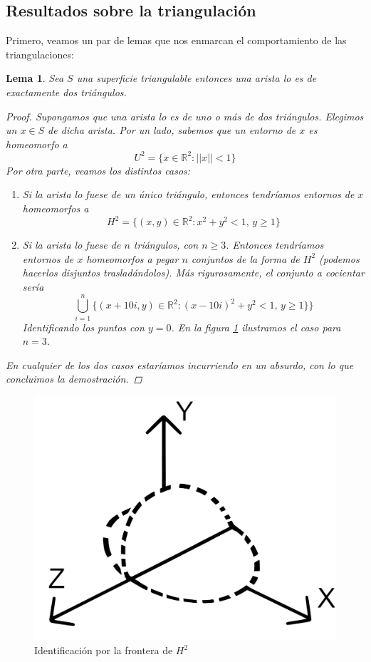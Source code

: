 \documentclass[a4paper,11pt,spanish, twoside, leqno]{tfg-uam}
\newcommand*{\reales}{\mathbb{R}}
\newtheorem{lema}[teor]{Lema}
\theoremstyle{definition}
\begin{document}
\subsection*{Resultados sobre la triangulación}

Primero, veamos un par de lemas que nos enmarcan el comportamiento de las triangulaciones:

\begin{lema}\label{lema:lema1detriangulacion}
Sea $S$ una superficie triangulable entonces una arista lo es de exactamente dos triángulos.

\begin{proof}
Supongamos que una arista lo es de uno o más de dos triángulos. Elegimos un $x\in S$ de dicha arista. Por un lado, sabemos que un entorno de $x$ es homeomorfo a 
\[U^2 = \{x\in\reales^2: ||x||<1\}\]
Por otra parte, veamos los distintos casos:

\begin{enumerate}
\item[(a)] Si la arista lo fuese de un único triángulo, entonces tendríamos entornos de $x$ homeomorfos a
\[ H^2 = \{(x,y)\in\reales^2: x^2+y^2<1, \, y\geq 1 \} \]

\item[(b)] Si la arista lo fuese de  $n$ triángulos, con $n\geq 3$. Entonces tendríamos entornos de $x$ homeomorfos a pegar $n$ conjuntos de la forma de $H^2$ (podemos hacerlos disjuntos trasladándolos). Más rigurosamente, el conjunto a cocientar sería
\[
   \bigcup^n_{i=1} \{(x+10i,y)\in\reales^2: (x-10i)^2+y^2<1, \, y\geq 1 \} \}	        
\]
Identificando los puntos con $y=0$. En la figura \ref{fig:tripleplano} ilustramos el caso para $n=3$.
\end{enumerate}    

En cualquier de los dos casos estaríamos incurriendo en un absurdo, con lo que concluimos la demostración.
\end{proof}
\end{lema}

\begin{figure}[h!]
	\centering
	\includegraphics[width=0.4\linewidth]{imagenes/tripleplano.png}
	\caption{Identificación por la frontera de $H^2$}
	\label{fig:tripleplano}
\end{figure}
\end{document}
